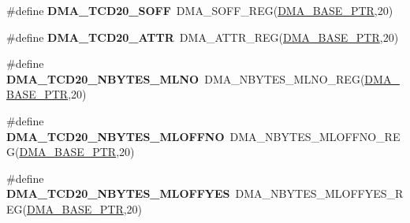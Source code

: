 \begin{DoxyCompactItemize}
\item 
\hypertarget{group___d_m_a___register___accessor___macros_gaf1de3b0aa42b2b610d24d0044f513285}{}\#define {\bfseries D\+M\+A\+\_\+\+T\+C\+D20\+\_\+\+S\+O\+F\+F}~D\+M\+A\+\_\+\+S\+O\+F\+F\+\_\+\+R\+E\+G(\hyperlink{group___d_m_a___peripheral_ga6997fbc1b1973e9f27170217a3bd6f22}{D\+M\+A\+\_\+\+B\+A\+S\+E\+\_\+\+P\+T\+R},20)\label{group___d_m_a___register___accessor___macros_gaf1de3b0aa42b2b610d24d0044f513285}

\item 
\hypertarget{group___d_m_a___register___accessor___macros_ga3ed5a7d05061f7846751eed6fa390cab}{}\#define {\bfseries D\+M\+A\+\_\+\+T\+C\+D20\+\_\+\+A\+T\+T\+R}~D\+M\+A\+\_\+\+A\+T\+T\+R\+\_\+\+R\+E\+G(\hyperlink{group___d_m_a___peripheral_ga6997fbc1b1973e9f27170217a3bd6f22}{D\+M\+A\+\_\+\+B\+A\+S\+E\+\_\+\+P\+T\+R},20)\label{group___d_m_a___register___accessor___macros_ga3ed5a7d05061f7846751eed6fa390cab}

\item 
\hypertarget{group___d_m_a___register___accessor___macros_gae69b2ff185285586c919dfc2331f4d3d}{}\#define {\bfseries D\+M\+A\+\_\+\+T\+C\+D20\+\_\+\+N\+B\+Y\+T\+E\+S\+\_\+\+M\+L\+N\+O}~D\+M\+A\+\_\+\+N\+B\+Y\+T\+E\+S\+\_\+\+M\+L\+N\+O\+\_\+\+R\+E\+G(\hyperlink{group___d_m_a___peripheral_ga6997fbc1b1973e9f27170217a3bd6f22}{D\+M\+A\+\_\+\+B\+A\+S\+E\+\_\+\+P\+T\+R},20)\label{group___d_m_a___register___accessor___macros_gae69b2ff185285586c919dfc2331f4d3d}

\item 
\hypertarget{group___d_m_a___register___accessor___macros_ga1ec69186920234bf6f9e905d81fdb713}{}\#define {\bfseries D\+M\+A\+\_\+\+T\+C\+D20\+\_\+\+N\+B\+Y\+T\+E\+S\+\_\+\+M\+L\+O\+F\+F\+N\+O}~D\+M\+A\+\_\+\+N\+B\+Y\+T\+E\+S\+\_\+\+M\+L\+O\+F\+F\+N\+O\+\_\+\+R\+E\+G(\hyperlink{group___d_m_a___peripheral_ga6997fbc1b1973e9f27170217a3bd6f22}{D\+M\+A\+\_\+\+B\+A\+S\+E\+\_\+\+P\+T\+R},20)\label{group___d_m_a___register___accessor___macros_ga1ec69186920234bf6f9e905d81fdb713}

\item 
\hypertarget{group___d_m_a___register___accessor___macros_ga62171886cc2b812d43a4752534f9c88e}{}\#define {\bfseries D\+M\+A\+\_\+\+T\+C\+D20\+\_\+\+N\+B\+Y\+T\+E\+S\+\_\+\+M\+L\+O\+F\+F\+Y\+E\+S}~D\+M\+A\+\_\+\+N\+B\+Y\+T\+E\+S\+\_\+\+M\+L\+O\+F\+F\+Y\+E\+S\+\_\+\+R\+E\+G(\hyperlink{group___d_m_a___peripheral_ga6997fbc1b1973e9f27170217a3bd6f22}{D\+M\+A\+\_\+\+B\+A\+S\+E\+\_\+\+P\+T\+R},20)\label{group___d_m_a___register___accessor___macros_ga62171886cc2b812d43a4752534f9c88e}


\end{DoxyCompactItemize}
